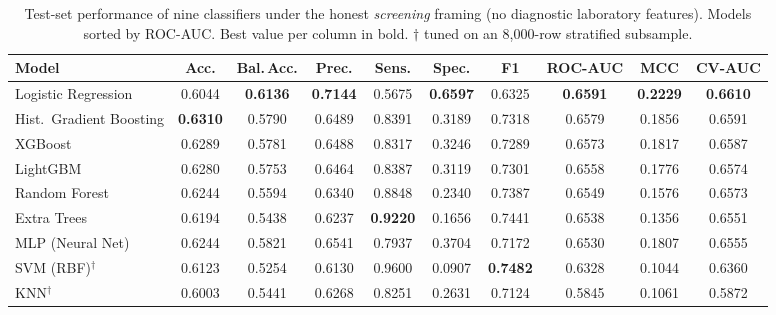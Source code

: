 \begin{table}[!t]
\renewcommand{\arraystretch}{1.25}
\caption{Test-set performance of nine classifiers under the honest \emph{screening}
framing (no diagnostic laboratory features). Models sorted by ROC-AUC. Best value
per column in bold. $\dagger$ tuned on an 8{,}000-row stratified subsample.}
\label{tab:comparison}
\centering
\begin{tabular}{l c c c c c c c c c}
\toprule
\textbf{Model} & \textbf{Acc.} & \textbf{Bal.\,Acc.} & \textbf{Prec.} & \textbf{Sens.} & \textbf{Spec.} & \textbf{F1} & \textbf{ROC-AUC} & \textbf{MCC} & \textbf{CV-AUC} \\
\midrule
Logistic Regression      & 0.6044 & \textbf{0.6136} & \textbf{0.7144} & 0.5675 & \textbf{0.6597} & 0.6325 & \textbf{0.6591} & \textbf{0.2229} & \textbf{0.6610} \\
Hist.\ Gradient Boosting & \textbf{0.6310} & 0.5790 & 0.6489 & 0.8391 & 0.3189 & 0.7318 & 0.6579 & 0.1856 & 0.6591 \\
XGBoost                  & 0.6289 & 0.5781 & 0.6488 & 0.8317 & 0.3246 & 0.7289 & 0.6573 & 0.1817 & 0.6587 \\
LightGBM                 & 0.6280 & 0.5753 & 0.6464 & 0.8387 & 0.3119 & 0.7301 & 0.6558 & 0.1776 & 0.6574 \\
Random Forest            & 0.6244 & 0.5594 & 0.6340 & 0.8848 & 0.2340 & 0.7387 & 0.6549 & 0.1576 & 0.6573 \\
Extra Trees              & 0.6194 & 0.5438 & 0.6237 & \textbf{0.9220} & 0.1656 & 0.7441 & 0.6538 & 0.1356 & 0.6551 \\
MLP (Neural Net)         & 0.6244 & 0.5821 & 0.6541 & 0.7937 & 0.3704 & 0.7172 & 0.6530 & 0.1807 & 0.6555 \\
SVM (RBF)$^{\dagger}$    & 0.6123 & 0.5254 & 0.6130 & 0.9600 & 0.0907 & \textbf{0.7482} & 0.6328 & 0.1044 & 0.6360 \\
KNN$^{\dagger}$          & 0.6003 & 0.5441 & 0.6268 & 0.8251 & 0.2631 & 0.7124 & 0.5845 & 0.1061 & 0.5872 \\
\bottomrule
\end{tabular}
\end{table}
